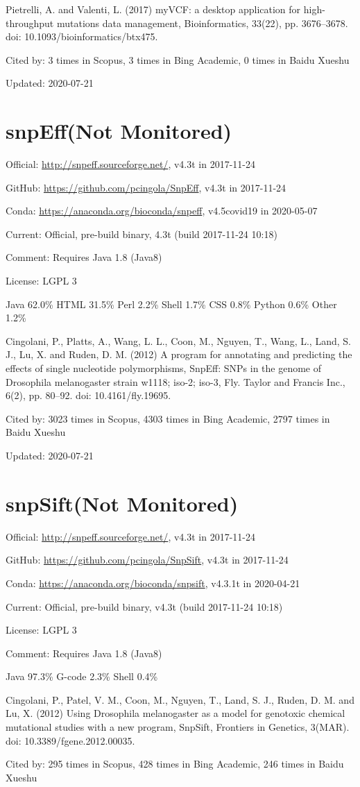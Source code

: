\documentclass[]{article}
\newcommand{\nm}{{\color{red}(Not Monitored)}}
\newcommand{\cb}[3]{\par Cited by: {\color{blue}\Huge #1} times in Scopus, {\color{blue}\Huge #2} times in Bing Academic, {\color{blue}\Huge #3} times in Baidu Xueshu}
\begin{document}
Pietrelli, A. and Valenti, L. (2017) myVCF: a desktop application for high-throughput mutations data management, Bioinformatics, 33(22), pp. 3676–3678. doi: 10.1093/bioinformatics/btx475.\cb{3}{3}{0}

Updated: 2020-07-21
\section{snpEff\nm}

Official: \url{http://snpeff.sourceforge.net/}, v4.3t in 2017-11-24

GitHub: \url{https://github.com/pcingola/SnpEff}, v4.3t in 2017-11-24

Conda: \url{https://anaconda.org/bioconda/snpeff}, v4.5covid19 in 2020-05-07

Current: Official, pre-build binary, 4.3t (build 2017-11-24 10:18)

Comment: Requires Java 1.8 (Java8)

License: LGPL 3

Java 62.0\% HTML 31.5\% Perl 2.2\% Shell 1.7\% CSS 0.8\% Python 0.6\% Other 1.2\%

Cingolani, P., Platts, A., Wang, L. L., Coon, M., Nguyen, T., Wang, L., Land, S. J., Lu, X. and Ruden, D. M. (2012) A program for annotating and predicting the effects of single nucleotide polymorphisms, SnpEff: SNPs in the genome of Drosophila melanogaster strain w1118; iso-2; iso-3, Fly. Taylor and Francis Inc., 6(2), pp. 80–92. doi: 10.4161/fly.19695.\cb{3023}{4303}{2797}

Updated: 2020-07-21

\section{snpSift\nm}

Official: \url{http://snpeff.sourceforge.net/}, v4.3t in 2017-11-24

GitHub: \url{https://github.com/pcingola/SnpSift}, v4.3t in 2017-11-24

Conda: \url{https://anaconda.org/bioconda/snpsift}, v4.3.1t in 2020-04-21

Current: Official, pre-build binary, v4.3t (build 2017-11-24 10:18)

License: LGPL 3

Comment: Requires Java 1.8 (Java8)

Java 97.3\% G-code 2.3\% Shell 0.4\%

Cingolani, P., Patel, V. M., Coon, M., Nguyen, T., Land, S. J., Ruden, D. M. and Lu, X. (2012) Using Drosophila melanogaster as a model for genotoxic chemical mutational studies with a new program, SnpSift, Frontiers in Genetics, 3(MAR). doi: 10.3389/fgene.2012.00035.\cb{295}{428}{246}
\end{document}
